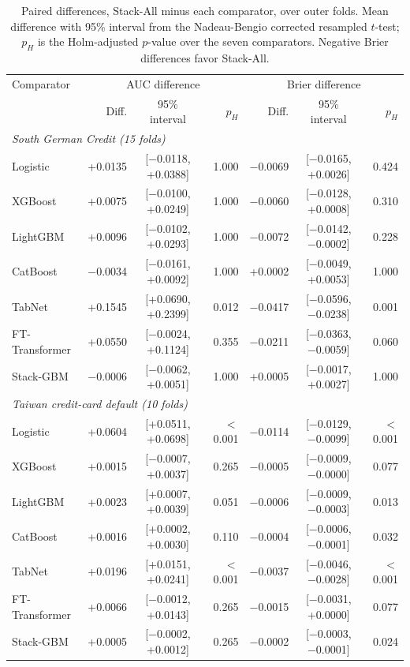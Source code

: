 \begin{table}[t]
\centering
\caption{Paired differences, Stack-All minus each comparator, over outer folds. Mean difference with 95\% interval from the Nadeau-Bengio corrected resampled $t$-test; $p_H$ is the Holm-adjusted $p$-value over the seven comparators. Negative Brier differences favor Stack-All.}
\label{tab:paired}
\small
\setlength{\tabcolsep}{2pt}
\begin{tabular}{l|rcr|rcr}
\toprule
Comparator & \multicolumn{3}{c|}{AUC difference} & \multicolumn{3}{c}{Brier difference}\\
 & Diff. & 95\% interval & $p_H$ & Diff. & 95\% interval & $p_H$\\
\midrule
\multicolumn{7}{l}{\textit{South German Credit (15 folds)}}\\
Logistic & +0.0135 & [$-$0.0118,  +0.0388] & 1.000 & $-$0.0069 & [$-$0.0165,  +0.0026] & 0.424\\
XGBoost & +0.0075 & [$-$0.0100,  +0.0249] & 1.000 & $-$0.0060 & [$-$0.0128,  +0.0008] & 0.310\\
LightGBM & +0.0096 & [$-$0.0102,  +0.0293] & 1.000 & $-$0.0072 & [$-$0.0142,  $-$0.0002] & 0.228\\
CatBoost & $-$0.0034 & [$-$0.0161,  +0.0092] & 1.000 & +0.0002 & [$-$0.0049,  +0.0053] & 1.000\\
TabNet & +0.1545 & [+0.0690,  +0.2399] & 0.012 & $-$0.0417 & [$-$0.0596,  $-$0.0238] & 0.001\\
FT-Transformer & +0.0550 & [$-$0.0024,  +0.1124] & 0.355 & $-$0.0211 & [$-$0.0363,  $-$0.0059] & 0.060\\
Stack-GBM & $-$0.0006 & [$-$0.0062,  +0.0051] & 1.000 & +0.0005 & [$-$0.0017,  +0.0027] & 1.000\\
\midrule
\multicolumn{7}{l}{\textit{Taiwan credit-card default (10 folds)}}\\
Logistic & +0.0604 & [+0.0511,  +0.0698] & $<$0.001 & $-$0.0114 & [$-$0.0129,  $-$0.0099] & $<$0.001\\
XGBoost & +0.0015 & [$-$0.0007,  +0.0037] & 0.265 & $-$0.0005 & [$-$0.0009,  $-$0.0000] & 0.077\\
LightGBM & +0.0023 & [+0.0007,  +0.0039] & 0.051 & $-$0.0006 & [$-$0.0009,  $-$0.0003] & 0.013\\
CatBoost & +0.0016 & [+0.0002,  +0.0030] & 0.110 & $-$0.0004 & [$-$0.0006,  $-$0.0001] & 0.032\\
TabNet & +0.0196 & [+0.0151,  +0.0241] & $<$0.001 & $-$0.0037 & [$-$0.0046,  $-$0.0028] & $<$0.001\\
FT-Transformer & +0.0066 & [$-$0.0012,  +0.0143] & 0.265 & $-$0.0015 & [$-$0.0031,  +0.0000] & 0.077\\
Stack-GBM & +0.0005 & [$-$0.0002,  +0.0012] & 0.265 & $-$0.0002 & [$-$0.0003,  $-$0.0001] & 0.024\\
\bottomrule
\end{tabular}
\end{table}
